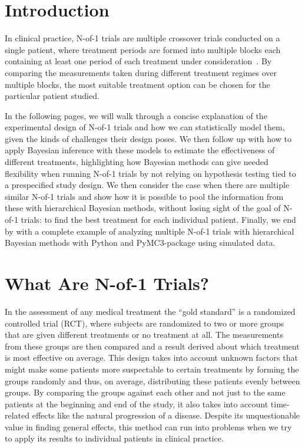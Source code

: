 \documentclass[12pt,a4paper,leqno]{report}
\theoremstyle{plain}
\theoremstyle{definition}
\theoremstyle{remark}
\begin{document}
\tableofcontents

\chapter*{Introduction}\label{intro}

In clinical practice, N-of-1 trials are multiple crossover trials conducted on a
single patient, where treatment periods are formed into multiple blocks each
containing at least one period of each treatment under
consideration\ \cite{nofone}. By comparing the measurements taken during different
treatment regimes over multiple blocks, the most suitable treatment option can
be chosen for the particular patient studied.

In the following pages, we will walk through a concise explanation of the
experimental design of N-of-1 trials and how we can statistically model them,
given the kinds of challenges their design poses. We then follow up with how to
apply Bayesian inference with these models to estimate the effectiveness of different
treatments, highlighting how Bayesian methods can give needed flexibility when
running N-of-1 trials by not relying on hypothesis testing tied to a
prespecified study design. We then consider the case when there are multiple
similar N-of-1 trials and show how it is possible to pool the information from
these with hierarchical Bayesian methods, without losing sight of the goal of
N-of-1 trials: to find the best treatment for each individual
patient. Finally, we end by with a complete example of analyzing multiple N-of-1
trials with hierarchical Bayesian methods with Python and PyMC3-package using
simulated data.

\chapter{What Are N-of-1 Trials?}\label{nof1}

In the assessment of any medical treatment the ``gold standard'' is a randomized
controlled trial (RCT), where subjects are randomized to two or more groups that
are given different treatments or no treatment at all. The measurements from
these groups are then compared and a result derived about which treatment is
most effective on average. This design takes into account unknown factors that
might make some patients more suspectable to certain treatments by forming the
groups randomly and thus, on average, distributing these patients evenly between
groups. By comparing the groups against each other and not just to the same
patients at the beginning and end of the study, it also takes into account time-related
effects like the natural progression of a disease. Despite its unquestionable value
in finding general effects, this method can run into problems when we
try to apply its results to individual patients in clinical practice.
\end{document}
